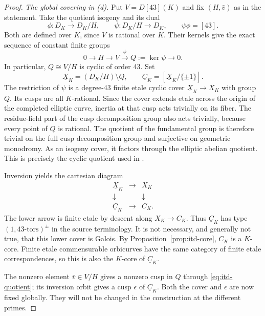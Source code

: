 \begin{proof}
\smallskip\noindent
\emph{The global covering in (d).}
Put $V=D[43](K)$ and fix $(H,\bar v)$ as in the statement. Take
the quotient isogeny and its dual
\[
 \phi:D_K\longrightarrow D_K/H,
 \qquad \psi:D_K/H\longrightarrow D_K,
 \qquad \psi\phi=[43].
\]
Both are defined over $K$, since $V$ is rational over $K$. Their
kernels give the exact sequence of constant finite groups
\begin{equation}\label{eq:itd-quotient}
 0\longrightarrow H\longrightarrow V
   \xrightarrow{\phi} Q:=\ker\psi\longrightarrow0.
\end{equation}
In particular, $Q\cong V/H$ is cyclic of order 43. Set
\begin{equation}\label{eq:itd-cover}
 \underline X_K=(D_K/H)\setminus Q,
 \qquad \underline C_K=[\underline X_K/\{\pm1\}].
\end{equation}
The restriction of $\psi$ is a degree-43 finite etale cyclic
cover $\underline X_K\to X_K$ with group $Q$. Its cusps are all
$K$-rational. Since the cover extends etale across the origin of
the completed elliptic curve, inertia at that cusp acts trivially
on its fiber. The residue-field part of the cusp decomposition
group also acts trivially, because every point of $Q$ is rational.
The quotient of the fundamental group is therefore trivial on
the full cusp decomposition group and surjective on geometric
monodromy. As an isogeny cover, it factors through the elliptic
abelian quotient. This is precisely the cyclic quotient used in
\cite[Definition~2.1 and its preceding construction]{MochEtaleTheta}.

Inversion yields the cartesian diagram
\begin{equation}\label{eq:itd-square}
 \begin{matrix}
  \underline X_K&\longrightarrow&X_K\\
  \downarrow&&\downarrow\\
  \underline C_K&\longrightarrow&C_K.
 \end{matrix}
\end{equation}
The lower arrow is finite etale by descent along $X_K\to C_K$.
Thus $\underline C_K$ has type $(1,43\text{-tors})^\pm$ in the
source terminology. It is not necessary, and generally not true,
that this lower cover is Galois. By
Proposition~\ref{prop:itd-core}, $C_K$ is a $K$-core. Finite
etale commensurable orbicurves have the same category of finite
etale correspondences, so this is also the $K$-core of
$\underline C_K$.

The nonzero element $\bar v\in V/H$ gives a nonzero cusp in
$Q$ through \eqref{eq:itd-quotient}; its inversion orbit gives a
cusp $\epsilon$ of $\underline C_K$. Both the cover and
$\epsilon$ are now fixed globally. They will not be changed in
the construction at the different primes.


\end{proof}
